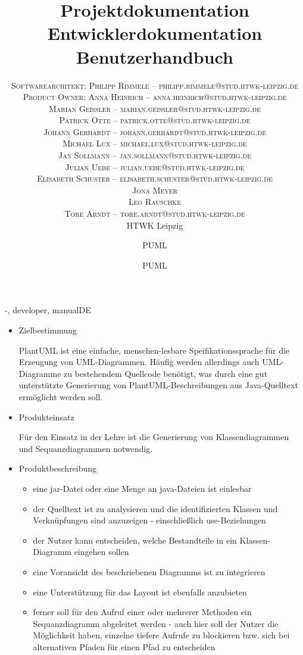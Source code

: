 \documentclass[twoside]{report}
\title{\vspace{-5mm}%
	\fontsize{24pt}{10pt}\selectfont
	\textbf{Projektdokumentation}
	}
\author{%
	\large
	\textsc{Softwarearchitekt: Philipp Rimmele -- philipp.rimmele@stud.htwk-leipzig.de} \\[2mm]
	\textsc{Product Owner: Anna Heinrich -- anna.heinrich@stud.htwk-leipzig.de} \\[2mm]
	\textsc{Marian Geißler -- marian.geissler@stud.htwk-leipzig.de} \\[2mm]
	\textsc{Patrick Otte -- patrick.otte@stud.htwk-leipzig.de} \\[2mm]
	\textsc{Johann Gerhardt -- johann.gerhardt@stud.htwk-leipzig.de} \\[2mm]
	\textsc{Michael Lux -- michael.lux@stud.htwk-leipzig.de}	\\[2mm]	
	\textsc{Jan Sollmann -- jan.sollmann@stud.htwk-leipzig.de} \\[2mm]
	\textsc{Julian Uebe -- julian.uebe@stud.htwk-leipzig.de} \\[2mm]
	\textsc{Elisabeth Schuster -- elisabeth.schuster@stud.htwk-leipzig.de} \\[2mm]		
	\textsc{Jona Meyer}	\\[2mm]	
	\textsc{Leo Rauschke}	\\[2mm]
	\textsc{Tore Arndt -- tore.arndt@stud.htwk-leipzig.de} \\[2mm]
	\normalsize	HTWK Leipzig 
	}
\date{}
\title{\vspace{-5mm}%
	\fontsize{24pt}{10pt}\selectfont
	\textbf{Entwicklerdokumentation}
	}
\author{%
	\large
	\textsc{PUML} \\[2mm]
	}
\date{}
\title{\vspace{-5mm}%
	\fontsize{24pt}{10pt}\selectfont
	\textbf{Benutzerhandbuch}
	}
\author{%
	\large
	\textsc{PUML} \\[2mm]
	}
\date{}
\begin{document}

\maketitle
\thispagestyle{fancy}

\tableofcontents


\begin{shownto}{-, developer, manualDE}


\begin{itemize}
\item Zielbestimmung

PlantUML ist eine einfache, menschen-lesbare Speifikationssprache für die Erzeugung von UML-Diagrammen. Häufig werden allerdings auch UML-Diagramme zu bestehendem Quellcode benötigt, was durch eine gut unterstützte Generierung von PlantUML-Beschreibungen aus Java-Quelltext ermöglicht werden soll.

\item Produkteinsatz
 
Für den Einsatz in der Lehre ist die Generierung von Klassendiagrammen und Sequanzdiagrammen notwendig.

\item Produktbeschreibung
\begin{itemize}
\item eine jar-Datei oder eine Menge an java-Dateien ist einlesbar
\item der Quelltext ist zu analysieren und die identifizierten Klassen und Verknüpfungen sind anzuzeigen - einschließlich use-Beziehungen
\item der Nutzer kann entscheiden, welche Bestandteile in ein Klassen-Diagramm eingehen sollen
\item eine Voransicht des beschriebenen Diagramms ist zu integrieren 
\item eine Unterstützung für das Layout ist ebenfalls anzubieten
\item ferner soll für den Aufruf einer oder mehrerer Methoden ein Sequanzdiagramm abgeleitet werden - auch hier soll der Nutzer die Möglichkeit haben, einzelne tiefere Aufrufe zu blockieren bzw. sich bei alternativen Pfaden für einen Pfad zu entscheiden
\end{itemize}
\end{itemize}
\nsecend


\end{shownto}
\end{document}
